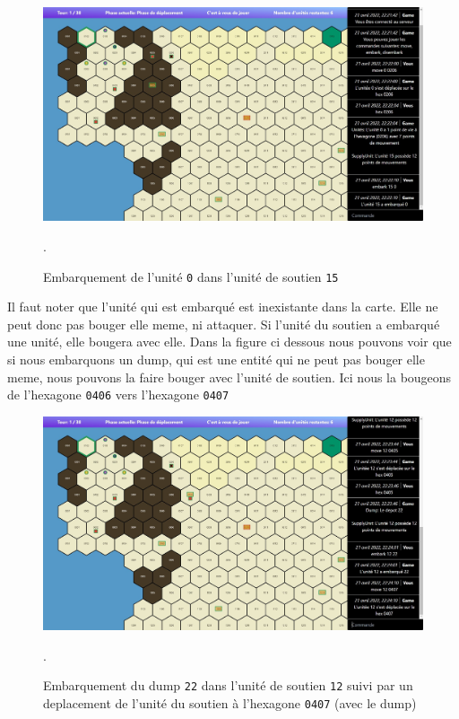 \begin{figure}[H]
    \centering
    \includegraphics[scale=0.35]{data/Embark_command.jpg}
    \caption{Embarquement de l'unité \lstinline{0} dans l'unité de soutien  \lstinline{15}}.
\end{figure}

Il faut noter que l'unité qui est embarqué est inexistante dans la carte. Elle ne peut donc pas bouger elle meme, ni attaquer. Si l'unité du soutien a embarqué une unité, elle bougera avec elle. Dans la figure ci dessous nous pouvons voir que si nous embarquons un dump, qui est une entité qui ne peut pas bouger elle meme, nous pouvons la faire bouger avec l'unité de soutien. Ici nous la bougeons de l'hexagone \lstinline{0406} vers l'hexagone \lstinline{0407} \\

\begin{figure}[H]
    \centering
    \includegraphics[scale=0.35]{data/Embark_dump.jpg}
    \caption{Embarquement du dump \lstinline{22} dans l'unité de soutien  \lstinline{12} suivi par un deplacement de l'unité du soutien à l'hexagone \lstinline{0407} (avec le dump)}.
\end{figure}

